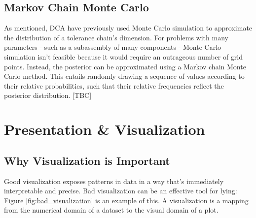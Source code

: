 \documentclass[11pt,a4paper,article]{memoir} %
\begin{document}
\subsection*{Markov Chain Monte Carlo}
As mentioned, DCA have previously used Monte Carlo simulation to approximate the distribution of a tolerance chain's dimension. For problems with many parameters - such as a subassembly of many components - Monte Carlo simulation isn't feasible because it would require an outrageous number of grid points. Instead, the posterior can be approximated using a Markov chain Monte Carlo method. This entails randomly drawing a sequence of values according to their relative probabilities, such that their relative frequencies reflect the posterior distribution. [TBC]

\section{Presentation \& Visualization}
\subsection{Why Visualization is Important}
Good visualization exposes patterns in data in a way that's immediately interpretable and precise. Bad visualization can be an effective tool for lying: Figure \ref{fig:bad_visualization} is an example of this. A visualization is a mapping from the numerical domain of a dataset to the visual domain of a plot.
\end{document}
